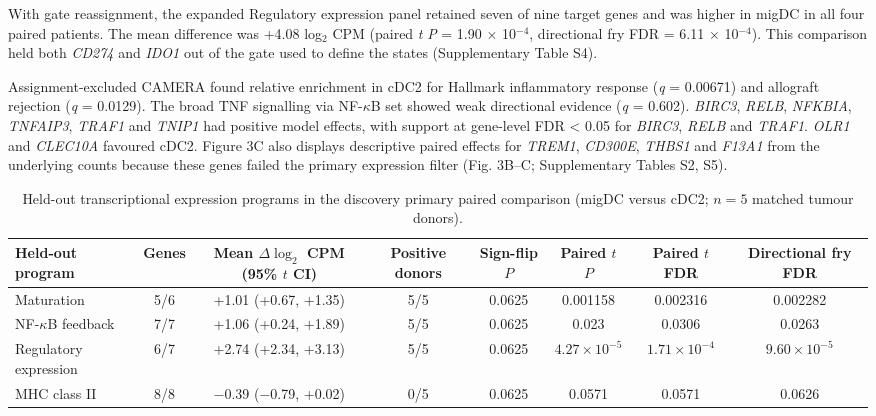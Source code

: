 \documentclass[11pt,a4paper]{article}
\begin{document}
With gate reassignment, the expanded Regulatory expression panel retained seven of nine target genes and was higher in migDC in all four paired patients. The mean difference was +4.08 log$_{2}$ CPM (paired \textit{t} \textit{P} = 1.90 $\times$ 10$^{-4}$, directional fry FDR = 6.11 $\times$ 10$^{-4}$). This comparison held both \textit{CD274} and \textit{IDO1} out of the gate used to define the states (Supplementary Table S4).

Assignment-excluded CAMERA found relative enrichment in cDC2 for Hallmark inflammatory response (\textit{q} = 0.00671) and allograft rejection (\textit{q} = 0.0129). The broad TNF signalling via NF-$\kappa$B set showed weak directional evidence (\textit{q} = 0.602). \textit{BIRC3}, \textit{RELB}, \textit{NFKBIA}, \textit{TNFAIP3}, \textit{TRAF1} and \textit{TNIP1} had positive model effects, with support at gene-level FDR < 0.05 for \textit{BIRC3}, \textit{RELB} and \textit{TRAF1}. \textit{OLR1} and \textit{CLEC10A} favoured cDC2. Figure 3C also displays descriptive paired effects for \textit{TREM1}, \textit{CD300E}, \textit{THBS1} and \textit{F13A1} from the underlying counts because these genes failed the primary expression filter (Fig. 3B--C; Supplementary Tables S2, S5).

\begin{table}[htbp]
\centering
\caption{Held-out transcriptional expression programs in the discovery primary paired comparison (migDC versus cDC2; $n = 5$ matched tumour donors).}
\scriptsize
\begin{tabular}{lccccccc}
\toprule
Held-out program & Genes & Mean $\Delta \log_2$ CPM (95\% $t$ CI) & Positive donors & Sign-flip $P$ & Paired $t$ $P$ & Paired $t$ FDR & Directional fry FDR \\
\midrule
Maturation & 5/6 & +1.01 (+0.67, +1.35) & 5/5 & 0.0625 & 0.001158 & 0.002316 & 0.002282 \\
NF-$\kappa$B feedback & 7/7 & +1.06 (+0.24, +1.89) & 5/5 & 0.0625 & 0.023 & 0.0306 & 0.0263 \\
Regulatory expression & 6/7 & +2.74 (+2.34, +3.13) & 5/5 & 0.0625 & $4.27 \times 10^{-5}$ & $1.71 \times 10^{-4}$ & $9.60 \times 10^{-5}$ \\
MHC class II & 8/8 & $-$0.39 ($-$0.79, +0.02) & 0/5 & 0.0625 & 0.0571 & 0.0571 & 0.0626 \\
\bottomrule
\end{tabular}
\end{table}
\end{document}
